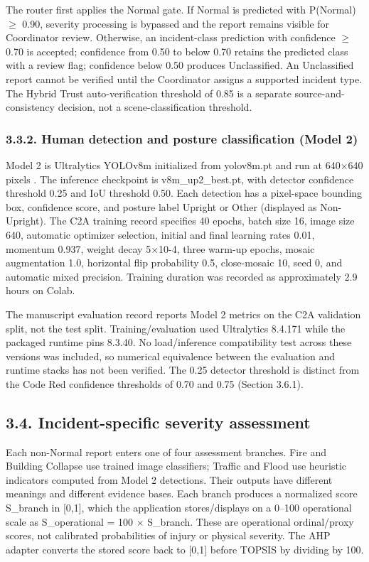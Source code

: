 \documentclass[pdflatex,sn-mathphys-ay]{sn-jnl}
\begin{document}
The router first applies the Normal gate. If Normal is predicted with P(Normal) $\geq$ 0.90, severity processing is bypassed and the report remains visible for Coordinator review. Otherwise, an incident-class prediction with confidence $\geq$0.70 is accepted; confidence from 0.50 to below 0.70 retains the predicted class with a review flag; confidence below 0.50 produces Unclassified. An Unclassified report cannot be verified until the Coordinator assigns a supported incident type. The Hybrid Trust auto-verification threshold of 0.85 is a separate source-and-consistency decision, not a scene-classification threshold.

\subsubsection*{3.3.2. Human detection and posture classification (Model 2)}

Model 2 is Ultralytics YOLOv8m initialized from yolov8m.pt and run at 640$\times$640 pixels \cite{ref21}. The inference checkpoint is v8m\_up2\_best.pt, with detector confidence threshold 0.25 and IoU threshold 0.50. Each detection has a pixel-space bounding box, confidence score, and posture label Upright or Other (displayed as Non-Upright). The C2A training record specifies 40 epochs, batch size 16, image size 640, automatic optimizer selection, initial and final learning rates 0.01, momentum 0.937, weight decay 5$\times$10-4, three warm-up epochs, mosaic augmentation 1.0, horizontal flip probability 0.5, close-mosaic 10, seed 0, and automatic mixed precision. Training duration was recorded as approximately 2.9 hours on Colab.

The manuscript evaluation record reports Model 2 metrics on the C2A validation split, not the test split. Training/evaluation used Ultralytics 8.4.171 while the packaged runtime pins 8.3.40. No load/inference compatibility test across these versions was included, so numerical equivalence between the evaluation and runtime stacks has not been verified. The 0.25 detector threshold is distinct from the Code Red confidence thresholds of 0.70 and 0.75 (Section 3.6.1).

\subsection*{3.4. Incident-specific severity assessment}

Each non-Normal report enters one of four assessment branches. Fire and Building Collapse use trained image classifiers; Traffic and Flood use heuristic indicators computed from Model 2 detections. Their outputs have different meanings and different evidence bases. Each branch produces a normalized score S\_branch in [0,1], which the application stores/displays on a 0--100 operational scale as S\_operational = 100 $\times$ S\_branch. These are operational ordinal/proxy scores, not calibrated probabilities of injury or physical severity. The AHP adapter converts the stored score back to [0,1] before TOPSIS by dividing by 100.
\end{document}
